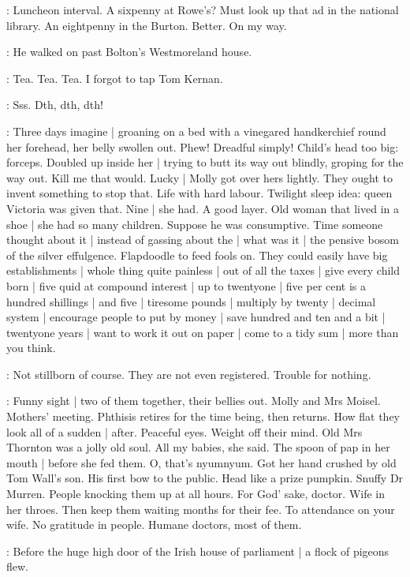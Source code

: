 \BloomInt:
Luncheon interval.
A sixpenny at Rowe's?
Must look up that ad in the national library.
An eightpenny in the Burton.
Better.
On my way.

:
He walked on past Bolton's Westmoreland house.

\BloomInt:
Tea.
Tea.
Tea.
I forgot to tap Tom Kernan.

\Bloom:
Sss.
Dth, dth, dth!

\BloomInt:
Three days imagine |
groaning on a bed with a vinegared handkerchief round her forehead,
her belly swollen out.
Phew!
Dreadful simply!
Child's head too big:
forceps.
Doubled up inside her |
trying to butt its way out blindly,
groping for the way out.
Kill me that would.
Lucky |
Molly got over hers lightly.
They ought to invent something to stop that.
Life with hard labour.
Twilight sleep idea:
queen Victoria was given that.
Nine |
she had.
A good layer.
Old woman that lived in a shoe |
she had so many children.
Suppose he was consumptive.
Time someone thought about it |
instead of gassing about the |
what was it |
the pensive bosom of the silver effulgence.
Flapdoodle to feed fools on.
They could easily have big establishments |
whole thing quite painless |
out of all the taxes |
give every child born |
five quid at compound interest |
up to twentyone |
five per cent is a hundred shillings |
and five |
tiresome pounds |
multiply by twenty |
decimal system |
encourage people to put by money |
save hundred and ten and a bit |
twentyone years |
want to work it out on paper |
come to a tidy sum |
more than you think.

\BloomInt:
Not stillborn of course.
They are not even registered.
Trouble for nothing.%

\BloomInt:
Funny sight |
two of them together,
their bellies out.
Molly and Mrs Moisel.
Mothers' meeting.
Phthisis retires for the time being,
then returns.
How flat they look all of a sudden |
after.
Peaceful eyes.
Weight off their mind.
Old Mrs Thornton was a jolly old soul.
All my babies,
she said.
The spoon of pap in her mouth |
before she fed them.
O, that's nyumnyum.
Got her hand crushed by old Tom Wall's son.
His first bow to the public.
Head like a prize pumpkin.
Snuffy Dr Murren.
People knocking them up at all hours.
For God' sake, doctor.
Wife in her throes.
Then keep them waiting months for their fee.
To attendance on your wife.
No gratitude in people.
Humane doctors,
most of them.

:
Before the huge high door of the Irish house of parliament |
a flock of pigeons flew.

